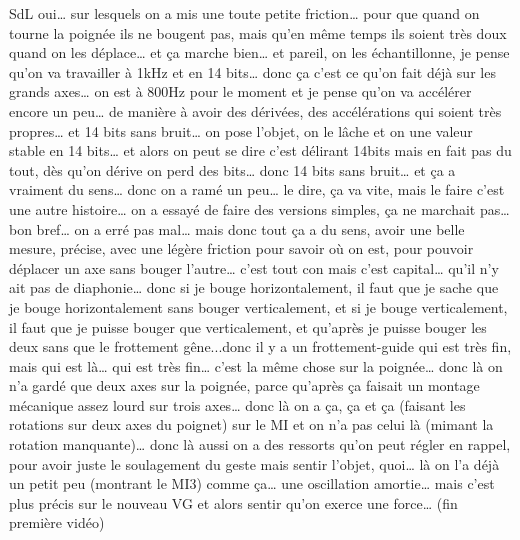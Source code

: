 SdL oui… sur lesquels on a mis une toute petite friction… pour que quand on tourne la poignée ils ne bougent pas, mais qu'en même temps ils soient très doux quand on les déplace… et ça marche bien… et pareil, on les échantillonne, je pense qu'on va travailler à 1kHz et en 14 bits… donc ça c'est ce qu'on fait déjà sur les grands axes… on est à 800Hz pour le moment et je pense qu'on va accélérer encore un peu… de manière à avoir des dérivées, des accélérations qui soient très propres… et 14 bits sans bruit… on pose l'objet, on le lâche et on une valeur stable en 14 bits… et alors on peut se dire c'est délirant 14bits mais en fait pas du tout, dès qu'on dérive on perd des bits… donc 14 bits sans bruit… et ça a vraiment du sens… donc on a ramé un peu… le dire, ça va vite, mais le faire c'est une autre histoire… on a essayé de faire des versions simples, ça ne marchait pas… bon bref… on a erré pas mal… mais donc tout ça a du sens, avoir une belle mesure, précise, avec une légère friction pour savoir où on est, pour pouvoir déplacer un axe sans bouger l'autre… c'est tout con mais c'est capital… qu'il n'y ait pas de diaphonie… donc si je bouge horizontalement, il faut que je sache que je bouge horizontalement sans bouger verticalement, et si je bouge verticalement, il faut que je puisse bouger que verticalement, et qu'après je puisse bouger les deux sans que le frottement gêne...donc il y a un frottement-guide qui est très fin, mais qui est là… qui est très fin… c'est la même chose sur la poignée… donc là on n'a gardé que deux axes sur la poignée, parce qu'après ça faisait un montage mécanique assez lourd sur trois axes… donc là on a ça, ça et ça (faisant les rotations sur deux axes du poignet) sur le MI et on n'a pas celui là (mimant la rotation manquante)… donc là aussi on a des ressorts qu'on peut régler en rappel, pour avoir juste le soulagement du geste mais sentir l'objet, quoi… là on l'a déjà un petit peu (montrant le MI3)  comme ça… une oscillation amortie… mais c'est plus précis sur le nouveau 
VG et alors sentir qu'on exerce une force… (fin première vidéo) 